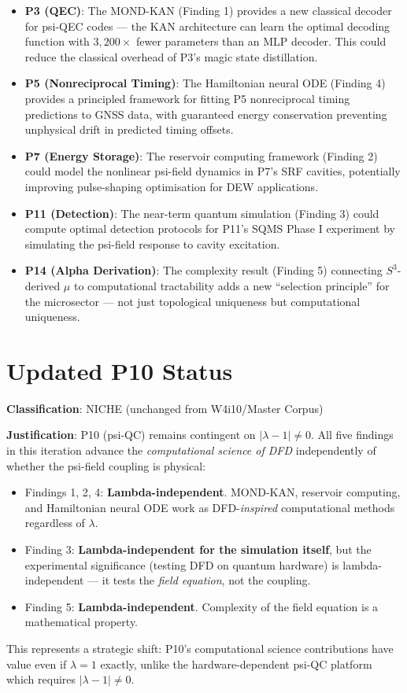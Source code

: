 \documentclass[11pt]{article}
\theoremstyle{definition}
\theoremstyle{remark}
\begin{document}
\begin{itemize}
\item \textbf{P3 (QEC)}: The MOND-KAN (Finding 1) provides a new classical
  decoder for psi-QEC codes --- the KAN architecture can learn the optimal
  decoding function with $3{,}200\times$ fewer parameters than an MLP decoder.
  This could reduce the classical overhead of P3's magic state distillation.

\item \textbf{P5 (Nonreciprocal Timing)}: The Hamiltonian neural ODE
  (Finding 4) provides a principled framework for fitting P5 nonreciprocal
  timing predictions to GNSS data, with guaranteed energy conservation
  preventing unphysical drift in predicted timing offsets.

\item \textbf{P7 (Energy Storage)}: The reservoir computing framework
  (Finding 2) could model the nonlinear psi-field dynamics in P7's SRF
  cavities, potentially improving pulse-shaping optimisation for DEW
  applications.

\item \textbf{P11 (Detection)}: The near-term quantum simulation (Finding 3)
  could compute optimal detection protocols for P11's SQMS Phase I
  experiment by simulating the psi-field response to cavity excitation.

\item \textbf{P14 (Alpha Derivation)}: The complexity result (Finding 5)
  connecting $S^3$-derived $\mu$ to computational tractability adds a
  new ``selection principle'' for the microsector --- not just topological
  uniqueness but computational uniqueness.
\end{itemize}

\section{Updated P10 Status}
\label{sec:p10-status}

\textbf{Classification}: NICHE (unchanged from W4i10/Master Corpus)

\textbf{Justification}: P10 (psi-QC) remains contingent on
$|\lambda - 1| \neq 0$. All five findings in this iteration advance the
\emph{computational science of DFD} independently of whether the psi-field
coupling is physical:

\begin{itemize}[nosep]
\item Findings 1, 2, 4: \textbf{Lambda-independent}. MOND-KAN, reservoir
  computing, and Hamiltonian neural ODE work as DFD-\emph{inspired}
  computational methods regardless of $\lambda$.
\item Finding 3: \textbf{Lambda-independent for the simulation itself}, but
  the experimental significance (testing DFD on quantum hardware) is
  lambda-independent --- it tests the \emph{field equation}, not the coupling.
\item Finding 5: \textbf{Lambda-independent}. Complexity of the field
  equation is a mathematical property.
\end{itemize}

This represents a strategic shift: P10's computational science contributions
have value even if $\lambda = 1$ exactly, unlike the hardware-dependent
psi-QC platform which requires $|\lambda - 1| \neq 0$.
\end{document}
